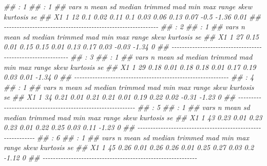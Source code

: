 \documentclass[
  10pt,
  a4paper,
]{book}
\newenvironment{Shaded}{\begin{snugshade}}{\end{snugshade}}
\newcommand{\DocumentationTok}[1]{\textcolor[rgb]{0.37,0.37,0.37}{\textit{#1}}}
\begin{document}
\begin{Shaded}
\begin{Highlighting}[]
\DocumentationTok{\#\# : 1}
\DocumentationTok{\#\# : 1}
\DocumentationTok{\#\#    vars  n mean   sd median trimmed  mad  min  max range skew kurtosis   se}
\DocumentationTok{\#\# X1    1 12  0.1 0.02   0.11     0.1 0.03 0.06 0.13  0.07 {-}0.5    {-}1.36 0.01}
\DocumentationTok{\#\# {-}{-}{-}{-}{-}{-}{-}{-}{-}{-}{-}{-}{-}{-}{-}{-}{-}{-}{-}{-}{-}{-}{-}{-}{-}{-}{-}{-}{-}{-}{-}{-}{-}{-}{-}{-}{-}{-}{-}{-}{-}{-}{-}{-}{-}{-}{-}{-}{-}{-}{-}{-}{-}{-}{-}{-}{-}{-}{-}{-} }
\DocumentationTok{\#\# : 2}
\DocumentationTok{\#\# : 1}
\DocumentationTok{\#\#    vars  n mean   sd median trimmed  mad  min  max range  skew kurtosis se}
\DocumentationTok{\#\# X1    1 27 0.15 0.01   0.15    0.15 0.01 0.13 0.17  0.03 {-}0.03    {-}1.34  0}
\DocumentationTok{\#\# {-}{-}{-}{-}{-}{-}{-}{-}{-}{-}{-}{-}{-}{-}{-}{-}{-}{-}{-}{-}{-}{-}{-}{-}{-}{-}{-}{-}{-}{-}{-}{-}{-}{-}{-}{-}{-}{-}{-}{-}{-}{-}{-}{-}{-}{-}{-}{-}{-}{-}{-}{-}{-}{-}{-}{-}{-}{-}{-}{-} }
\DocumentationTok{\#\# : 3}
\DocumentationTok{\#\# : 1}
\DocumentationTok{\#\#    vars  n mean   sd median trimmed  mad  min  max range skew kurtosis se}
\DocumentationTok{\#\# X1    1 29 0.18 0.01   0.18    0.18 0.01 0.17 0.19  0.03 0.01    {-}1.34  0}
\DocumentationTok{\#\# {-}{-}{-}{-}{-}{-}{-}{-}{-}{-}{-}{-}{-}{-}{-}{-}{-}{-}{-}{-}{-}{-}{-}{-}{-}{-}{-}{-}{-}{-}{-}{-}{-}{-}{-}{-}{-}{-}{-}{-}{-}{-}{-}{-}{-}{-}{-}{-}{-}{-}{-}{-}{-}{-}{-}{-}{-}{-}{-}{-} }
\DocumentationTok{\#\# : 4}
\DocumentationTok{\#\# : 1}
\DocumentationTok{\#\#    vars  n mean   sd median trimmed  mad  min  max range  skew kurtosis se}
\DocumentationTok{\#\# X1    1 34 0.21 0.01   0.21    0.21 0.01 0.19 0.22  0.02 {-}0.31    {-}1.23  0}
\DocumentationTok{\#\# {-}{-}{-}{-}{-}{-}{-}{-}{-}{-}{-}{-}{-}{-}{-}{-}{-}{-}{-}{-}{-}{-}{-}{-}{-}{-}{-}{-}{-}{-}{-}{-}{-}{-}{-}{-}{-}{-}{-}{-}{-}{-}{-}{-}{-}{-}{-}{-}{-}{-}{-}{-}{-}{-}{-}{-}{-}{-}{-}{-} }
\DocumentationTok{\#\# : 5}
\DocumentationTok{\#\# : 1}
\DocumentationTok{\#\#    vars  n mean   sd median trimmed  mad  min  max range skew kurtosis se}
\DocumentationTok{\#\# X1    1 43 0.23 0.01   0.23    0.23 0.01 0.22 0.25  0.03 0.11    {-}1.23  0}
\DocumentationTok{\#\# {-}{-}{-}{-}{-}{-}{-}{-}{-}{-}{-}{-}{-}{-}{-}{-}{-}{-}{-}{-}{-}{-}{-}{-}{-}{-}{-}{-}{-}{-}{-}{-}{-}{-}{-}{-}{-}{-}{-}{-}{-}{-}{-}{-}{-}{-}{-}{-}{-}{-}{-}{-}{-}{-}{-}{-}{-}{-}{-}{-} }
\DocumentationTok{\#\# : 6}
\DocumentationTok{\#\# : 1}
\DocumentationTok{\#\#    vars  n mean   sd median trimmed  mad  min  max range skew kurtosis se}
\DocumentationTok{\#\# X1    1 45 0.26 0.01   0.26    0.26 0.01 0.25 0.27  0.03  0.2    {-}1.12  0}
\DocumentationTok{\#\# {-}{-}{-}{-}{-}{-}{-}{-}{-}{-}{-}{-}{-}{-}{-}{-}{-}{-}{-}{-}{-}{-}{-}{-}{-}{-}{-}{-}{-}{-}{-}{-}{-}{-}{-}{-}{-}{-}{-}{-}{-}{-}{-}{-}{-}{-}{-}{-}{-}{-}{-}{-}{-}{-}{-}{-}{-}{-}{-}{-} }

\end{Highlighting}
\end{Shaded}
\end{document}
